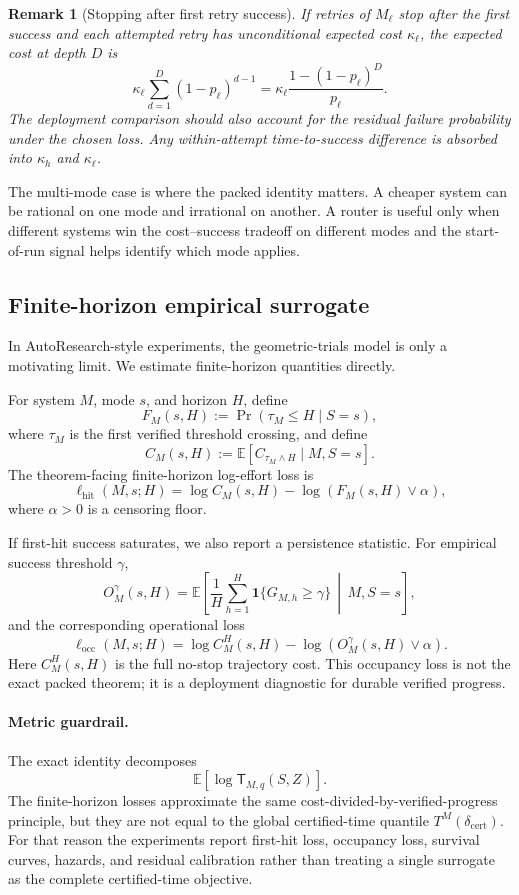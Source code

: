 \documentclass{article}
\newtheorem{remark}{Remark}
\newcommand{\E}{\mathbb{E}}
\newcommand{\one}{\mathbf{1}}
\begin{document}
\begin{remark}[Stopping after first retry success]
If retries of \(M_\ell\) stop after the first success and each attempted retry has
unconditional expected cost \(\kappa_\ell\), the expected cost at depth \(D\) is
\[
    \kappa_\ell
    \sum_{d=1}^{D}(1-p_\ell)^{d-1}
    =
    \kappa_\ell\frac{1-(1-p_\ell)^D}{p_\ell}.
\]
The deployment comparison should also account for the residual failure probability under
the chosen loss.  Any within-attempt time-to-success difference is absorbed into
\(\kappa_h\) and \(\kappa_\ell\).
\end{remark}

The multi-mode case is where the packed identity matters.  A cheaper system can be
rational on one mode and irrational on another.  A router is useful only when different
systems win the cost--success tradeoff on different modes and the start-of-run signal helps
identify which mode applies.



\subsection{Finite-horizon empirical surrogate}

In AutoResearch-style experiments, the geometric-trials model is only a motivating limit.
We estimate finite-horizon quantities directly.

For system \(M\), mode \(s\), and horizon \(H\), define
\[
    F_M(s,H):=\Pr(\tau_M\le H\mid S=s),
\]
where \(\tau_M\) is the first verified threshold crossing, and define
\[
    C_M(s,H):=\E[C_{\tau_M\wedge H}\mid M,S=s].
\]
The theorem-facing finite-horizon log-effort loss is
\[
    \ell_{\mathrm{hit}}(M,s;H)
    =
    \log C_M(s,H)-\log(F_M(s,H)\vee\alpha),
\]
where \(\alpha>0\) is a censoring floor.

If first-hit success saturates, we also report a persistence statistic.  For empirical
success threshold \(\gamma\),
\[
    O_M^\gamma(s,H)
    =
    \E\left[
        \frac1H\sum_{h=1}^H
        \one\{G_{M,h}\ge\gamma\}
        \,\middle|\,
        M,S=s
    \right],
\]
and the corresponding operational loss
\[
    \ell_{\mathrm{occ}}(M,s;H)
    =
    \log C_M^H(s,H)-\log(O_M^\gamma(s,H)\vee\alpha).
\]
Here \(C_M^H(s,H)\) is the full no-stop trajectory cost.
This occupancy loss is not the exact packed theorem; it is a deployment diagnostic for
durable verified progress.

\paragraph{Metric guardrail.}
The exact identity decomposes
\[
    \E[\log \mathsf T_{M,q}(S,Z)].
\]
The finite-horizon losses approximate the same cost-divided-by-verified-progress principle,
but they are not equal to the global certified-time quantile
\(T^M(\delta_{\mathrm{cert}})\).
For that reason the experiments report first-hit loss, occupancy loss, survival curves,
hazards, and residual calibration rather than treating a single surrogate as the complete
certified-time objective.
\end{document}
